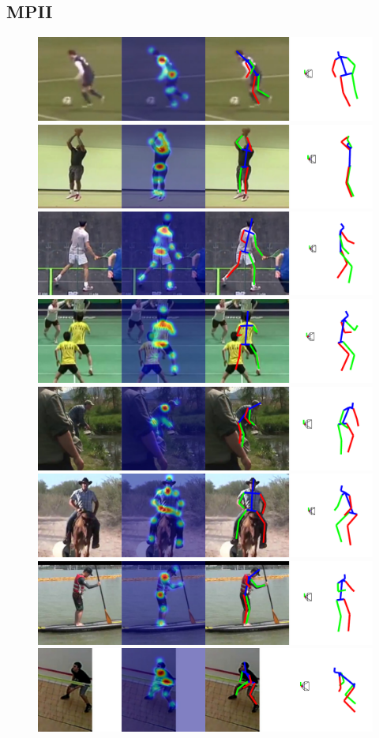 \subsection{MPII}

\begin{figure}
  \centering
  \includegraphics[width=0.48\linewidth]{figures/examples/mpii/mpii-001.pdf}
  \includegraphics[width=0.48\linewidth]{figures/examples/mpii/mpii-004.pdf}
  \includegraphics[width=0.48\linewidth]{figures/examples/mpii/mpii-010.pdf}
  \includegraphics[width=0.48\linewidth]{figures/examples/mpii/mpii-014.pdf}
  \includegraphics[width=0.48\linewidth]{figures/examples/mpii/mpii-016.pdf}
  \includegraphics[width=0.48\linewidth]{figures/examples/mpii/mpii-022.pdf}
  \includegraphics[width=0.48\linewidth]{figures/examples/mpii/mpii-043.pdf}
  \includegraphics[width=0.48\linewidth]{figures/examples/mpii/mpii-044.pdf}

\end{figure}
